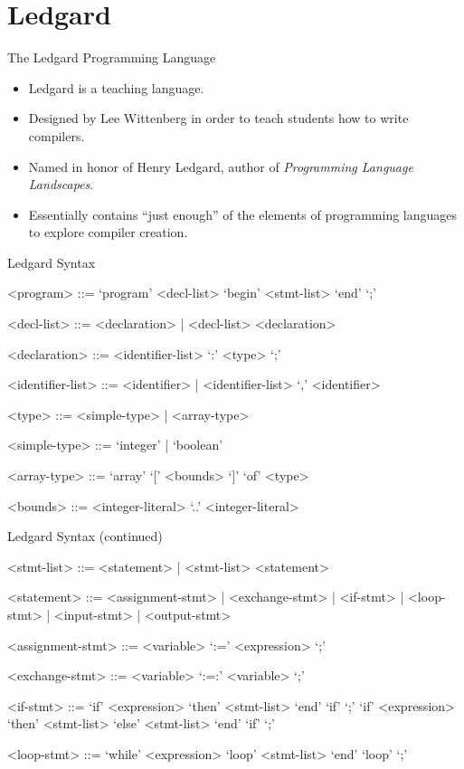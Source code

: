 \documentclass{beamer}
\begin{document}
\section{Ledgard}

\begin{frame}{The Ledgard Programming Language}
    \begin{itemize}[<+->]
        \item Ledgard is a teaching language.
        \item Designed by Lee Wittenberg in order to teach students
            how to write compilers.
        \item Named in honor of Henry Ledgard, author of 
            {\em Programming Language Landscapes}.
        \item Essentially contains ``just enough'' of the elements of
            programming languages to explore compiler creation.
    \end{itemize}
\end{frame}

\begin{frame}{Ledgard Syntax}
    \begin{grammar}
        <program> ::= `program' <decl-list> `begin' <stmt-list> `end' `;'

        <decl-list> ::= <declaration> | <decl-list> <declaration>

        <declaration> ::= <identifier-list> `:' <type> `;'

        <identifier-list> ::= <identifier> | <identifier-list> `,'
            <identifier>

        <type> ::= <simple-type> | <array-type>

        <simple-type> ::= `integer' | `boolean'

        <array-type> ::= `array' `[' <bounds> `]' `of' <type>

        <bounds> ::= <integer-literal> `..' <integer-literal>
    \end{grammar}
\end{frame}

\begin{frame}{Ledgard Syntax (continued)}
    \begin{grammar}
        <stmt-list> ::= <statement> | <stmt-list> <statement>

        <statement> ::= <assignment-stmt> | <exchange-stmt>
            | <if-stmt>  | <loop-stmt> | <input-stmt> | <output-stmt>

        <assignment-stmt> ::= <variable> `:=' <expression> `;'

        <exchange-stmt> ::= <variable> `:=:' <variable> `;'

        <if-stmt> ::= `if' <expression> `then' <stmt-list> `end' `if' `;'
            \alt `if' <expression> `then' <stmt-list> `else'
            <stmt-list> `end' `if' `;'

        <loop-stmt> ::= `while' <expression> `loop' <stmt-list> `end'
            `loop' `;'
    \end{grammar}
\end{frame}
\end{document}
